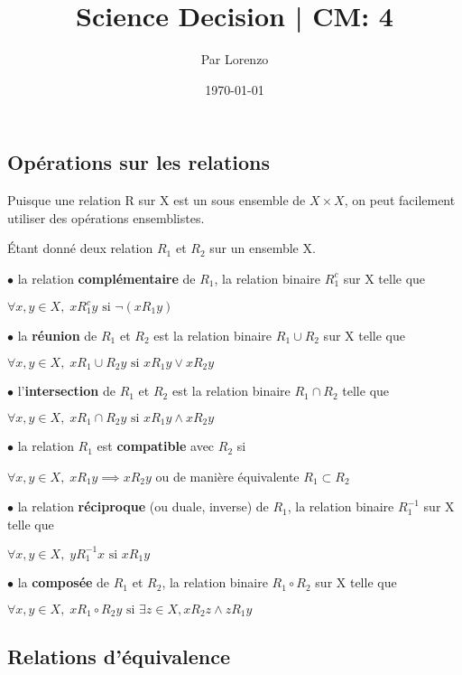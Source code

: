 \documentclass[a4paper, 12pt]{article}
\title{Science Decision | CM: 4}
\author{Par Lorenzo}
\date{\today}
\begin{document}
\maketitle

\subsection{Opérations sur les relations}

Puisque une relation R sur X est un sous ensemble de $X \times X$, on peut facilement utiliser
des opérations ensemblistes.

\begin{definition}
    Étant donné deux relation $R_1$ et $R_2$ sur un ensemble X.

    \item $\bullet$ la relation \textbf{complémentaire} de $R_1$, la relation binaire $R_1^c$ sur X telle que
    
    $\forall x, y \in X, \; x R_1^c y \text{ si } \neg(x R_1 y)$
    \item $\bullet$ la \textbf{réunion} de $R_1$ et $R_2$ est la relation binaire $R_1 \cup R_2$ sur X telle que
    
    $\forall x, y \in X, \; x R_1 \cup R_2 y \text{ si } x R_1 y \lor x R_2 y$
    \item $\bullet$ l'\textbf{intersection} de $R_1$ et $R_2$ est la relation binaire $R_1 \cap R_2$ telle que
    
    $\forall x, y \in X, \; x R_1 \cap R_2 y \text{ si } x R_1 y \land x R_2 y$
    \item $\bullet$ la relation $R_1$ est \textbf{compatible} avec $R_2$ si
    
    $\forall x, y \in X, \; x R_1 y \implies x R_2 y$ ou de manière équivalente $R_1 \subset R_2$
    \item $\bullet$ la relation \textbf{réciproque} (ou duale, inverse) de $R_1$,
    la relation binaire $R_1^{-1}$ sur X telle que
    
    $\forall x, y \in X, \; y R_1^{-1} x \text{ si } x R_1 y$
    \item $\bullet$ la \textbf{composée} de $R_1$ et $R_2$,
    la relation binaire $R_1 \circ R_2$ sur X telle que

    $\forall x, y \in X, \; x R_1 \circ R_2 y \text{ si }\exists z \in X, x R_2 z \land z R_1 y$
\end{definition}

\subsection{Relations d'équivalence}
\end{document}

